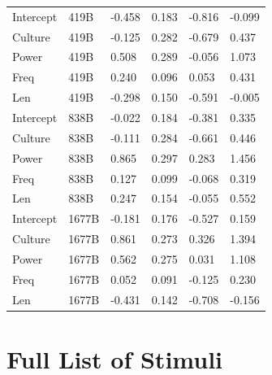 \documentclass[
  12pt,
  letterpaper,
]{scrreport}
\begin{document}
\begin{longtable}[]{@{}llllll@{}}
Intercept & 419B & -0.458 & 0.183 & -0.816 & -0.099 \\
Culture & 419B & -0.125 & 0.282 & -0.679 & 0.437 \\
Power & 419B & 0.508 & 0.289 & -0.056 & 1.073 \\
Freq & 419B & 0.240 & 0.096 & 0.053 & 0.431 \\
Len & 419B & -0.298 & 0.150 & -0.591 & -0.005 \\
Intercept & 838B & -0.022 & 0.184 & -0.381 & 0.335 \\
Culture & 838B & -0.111 & 0.284 & -0.661 & 0.446 \\
Power & 838B & 0.865 & 0.297 & 0.283 & 1.456 \\
Freq & 838B & 0.127 & 0.099 & -0.068 & 0.319 \\
Len & 838B & 0.247 & 0.154 & -0.055 & 0.552 \\
Intercept & 1677B & -0.181 & 0.176 & -0.527 & 0.159 \\
Culture & 1677B & 0.861 & 0.273 & 0.326 & 1.394 \\
Power & 1677B & 0.562 & 0.275 & 0.031 & 1.108 \\
Freq & 1677B & 0.052 & 0.091 & -0.125 & 0.230 \\
Len & 1677B & -0.431 & 0.142 & -0.708 & -0.156 \\
\end{longtable}

\chapter{Full List of Stimuli}\label{sec-full-list-of-stimuli}

\tiny
\end{document}
